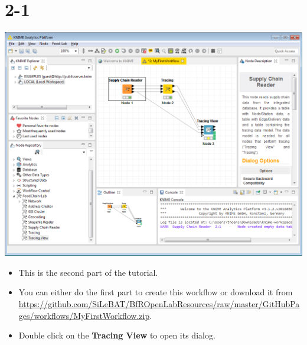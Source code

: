 \documentclass[10pt]{beamer}
\begin{document}
\section{2-1}
\begin{frame}
	\begin{center}
  		\includegraphics[height=0.6\textheight]{2-1.png}
	\end{center}
	\begin{itemize}
		\item This is the second part of the tutorial.
		\item You can either do the first part to create this workflow or download it from \url{https://github.com/SiLeBAT/BfROpenLabResources/raw/master/GitHubPages/workflows/MyFirstWorkflow.zip}.
		\item Double click on the \textbf{Tracing View} to open its dialog.
	\end{itemize}
\end{frame}
\end{document}
